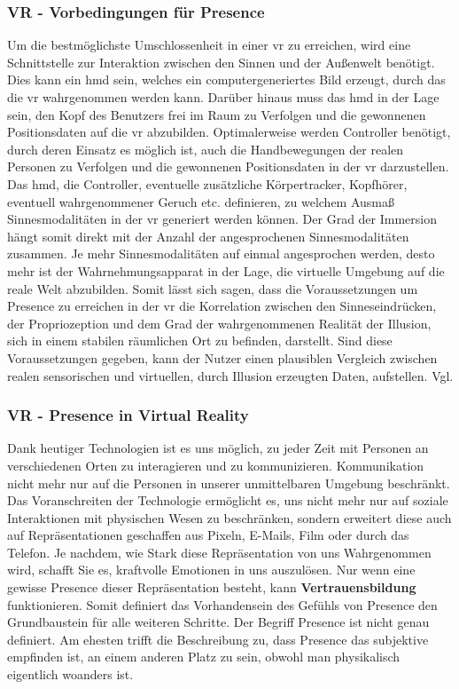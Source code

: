 \documentclass[a4paper,11pt]{article}%
\renewcommand{\\}{\vspace*{0.5\baselineskip} \newline}
\begin{document}
		\subsubsection{VR - Vorbedingungen für Presence}
Um die bestmöglichste Umschlossenheit in einer \ac{vr} zu erreichen, wird eine Schnittstelle zur Interaktion zwischen den Sinnen und der Außenwelt benötigt. Dies kann ein \ac{hmd} sein, welches ein computergeneriertes Bild erzeugt, durch das die \ac{vr} wahrgenommen werden kann. Darüber hinaus muss das \ac{hmd} in der Lage sein, den Kopf des Benutzers frei im Raum zu Verfolgen und die gewonnenen Positionsdaten auf die \ac{vr} abzubilden. Optimalerweise werden Controller benötigt, durch deren Einsatz es möglich ist, auch die Handbewegungen der realen Personen zu Verfolgen und die gewonnenen Positionsdaten in der \ac{vr} darzustellen. Das \ac{hmd}, die Controller, eventuelle zusätzliche Körpertracker, Kopfhörer, eventuell wahrgenommener Geruch etc. definieren, zu welchem Ausmaß Sinnesmodalitäten in der \ac{vr} generiert werden können. Der Grad der Immersion hängt somit direkt mit der Anzahl der angesprochenen Sinnesmodalitäten zusammen. Je mehr Sinnesmodalitäten auf einmal angesprochen werden, desto mehr ist der Wahrnehmungsapparat in der Lage, die virtuelle Umgebung auf die reale Welt abzubilden. \\
Somit lässt sich sagen, dass die Voraussetzungen um \dq Presence\dq{} zu erreichen in der \ac{vr} die Korrelation zwischen den Sinneseindrücken, der Propriozeption und dem Grad der wahrgenommenen Realität der Illusion, sich in einem stabilen räumlichen Ort zu befinden, darstellt. Sind diese Voraussetzungen gegeben, kann der Nutzer einen plausiblen Vergleich zwischen realen sensorischen und virtuellen, durch Illusion erzeugten Daten, aufstellen. Vgl. \citep{slater2009we}

		\subsubsection{VR - Presence in Virtual Reality}
			
	Dank heutiger Technologien ist es uns möglich, zu jeder Zeit mit Personen an verschiedenen Orten zu interagieren und zu kommunizieren. Kommunikation nicht mehr nur auf die Personen in unserer unmittelbaren Umgebung beschränkt. 
	Das Voranschreiten der Technologie ermöglicht es, uns nicht mehr nur auf soziale Interaktionen mit physischen Wesen zu beschränken, sondern erweitert diese auch auf Repräsentationen geschaffen aus Pixeln, E-Mails, Film oder durch das Telefon. Je nachdem, wie Stark diese Repräsentation von uns Wahrgenommen wird, schafft Sie es, kraftvolle Emotionen in uns auszulösen.\citep[p. 4-6]{biocca2002defining}\\
	Nur wenn eine gewisse \dq Presence\dq{} dieser Repräsentation besteht, kann \textbf{Vertrauensbildung} funktionieren. Somit definiert das Vorhandensein des Gefühls von \dq Presence \dq{} den Grundbaustein für alle weiteren Schritte.\\
	Der Begriff \dq Presence\dq{} ist nicht genau definiert. Am ehesten trifft die Beschreibung zu, dass \dq Presence\dq{} das subjektive empfinden ist, an einem anderen Platz zu sein, obwohl man physikalisch eigentlich woanders ist. \citep[p. 1]{witmer1998measuring} 
\end{document}
